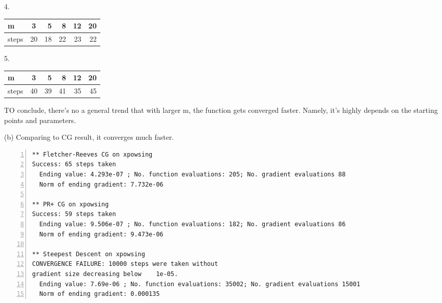 \documentclass[12pt]{article}
\begin{document}
\begin{enumerate}
4.

\begin{tabular}{|l|c|r|r|r|r|}
m & 3 & 5 & 8 & 12 & 20\\
\hline
steps & 20 & 18 & 22 & 23 & 22\\
\end{tabular}

5.

\begin{tabular}{|l|c|r|r|r|r|}
m & 3 & 5 & 8 & 12 & 20\\
\hline
steps & 40 & 39 & 41 & 35 & 45\\
\end{tabular}

TO conclude, there's no a general trend that with larger m, the function gets converged faster. Namely, it's highly depends on the starting points and parameters.

(b) Comparing to CG result, it converges much faster.


\begin{lstlisting}[language={[ANSI]C}, numbers=left, numberstyle=\tiny, frame=shadowbox, basicstyle=\ttfamily\small, showspaces=false, breaklines=true, showstringspaces=false, showtabs=false]
** Fletcher-Reeves CG on xpowsing
Success: 65 steps taken
  Ending value: 4.293e-07 ; No. function evaluations: 205; No. gradient evaluations 88
  Norm of ending gradient: 7.732e-06
  
** PR+ CG on xpowsing
Success: 59 steps taken
  Ending value: 9.506e-07 ; No. function evaluations: 182; No. gradient evaluations 86
  Norm of ending gradient: 9.473e-06

** Steepest Descent on xpowsing
CONVERGENCE FAILURE: 10000 steps were taken without
gradient size decreasing below    1e-05.
  Ending value: 7.69e-06 ; No. function evaluations: 35002; No. gradient evaluations 15001
  Norm of ending gradient: 0.000135
\end{lstlisting}

\end{enumerate}
\end{document}
